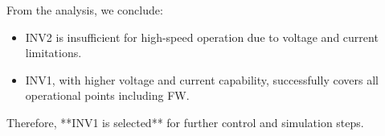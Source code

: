 From the analysis, we conclude:

\begin{itemize}
    \item INV2 is insufficient for high-speed operation due to voltage and current limitations.
    \item INV1, with higher voltage and current capability, successfully covers all operational points including FW.
\end{itemize}

Therefore, **INV1 is selected** for further control and simulation steps.

